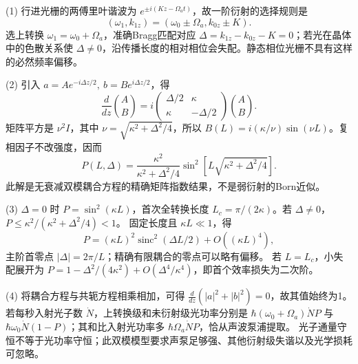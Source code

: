 (1) 行进光栅的两傅里叶谐波为 \(e^{\pm i(Kz-\Omega_at)}\)，故一阶衍射的选择规则是
\[
(\omega_1,k_{1z})=(\omega_0\pm\Omega_a,k_{0z}\pm K).
\]
选上转换 \(\omega_1=\omega_0+\Omega_a\)，准确Bragg匹配对应 \(\Delta=k_{1z}-k_{0z}-K=0\)；若光在晶体中的色散关系使 \(\Delta\ne0\)，沿传播长度的相对相位会失配。静态相位光栅不具有这样的必然频率偏移。

(2) 引入 \(a=Ae^{-i\Delta z/2},\ b=Be^{i\Delta z/2}\)，得
\[
\frac d{dz}\binom A B
=i\begin{pmatrix}\Delta/2&\kappa\\\kappa&-\Delta/2\end{pmatrix}\binom A B.
\]
矩阵平方是 \(\nu^2 I\)，其中 \(\nu=\sqrt{\kappa^2+\Delta^2/4}\)，所以
\(B(L)=i(\kappa/\nu)\sin(\nu L)\)。复相因子不改强度，因而
\[
\boxed{P(L,\Delta)=\frac{\kappa^2}{\kappa^2+\Delta^2/4}
\sin^2[L\sqrt{\kappa^2+\Delta^2/4}]}.
\]
此解是无衰减双模耦合方程的精确矩阵指数结果，不是弱衍射的Born近似。

(3) \(\Delta=0\) 时 \(P=\sin^2(\kappa L)\)，首次全转换长度
\(L_c=\pi/(2\kappa)\)。若 \(\Delta\ne0\)，
\(P\le\kappa^2/(\kappa^2+\Delta^2/4)<1\)。
固定长度且 \(\kappa L\ll1\)，得
\[
P=(\kappa L)^2\operatorname{sinc}^2(\Delta L/2)+O((\kappa L)^4),
\]
主阶首零点 \(|\Delta|=2\pi/L\)；精确有限耦合的零点可以略有偏移。
若 \(L=L_c\)，小失配展开为
\(P=1-\Delta^2/(4\kappa^2)+O(\Delta^4/\kappa^4)\)，即首个效率损失为二次阶。

(4) 将耦合方程与共轭方程相乘相加，可得
\(\frac d{dz}(|a|^2+|b|^2)=0\)，故其值始终为1。
若每秒入射光子数 \(\dot N\)，上转换级和未衍射级光功率分别是
\(\hbar(\omega_0+\Omega_a)\dot N P\) 与
\(\hbar\omega_0\dot N(1-P)\)；其和比入射光功率多
\(\hbar\Omega_a\dot N P\)，恰从声波泵浦提取。
光子通量守恒不等于光功率守恒；此双模模型要求声泵足够强、其他衍射级失谐以及光学损耗可忽略。
